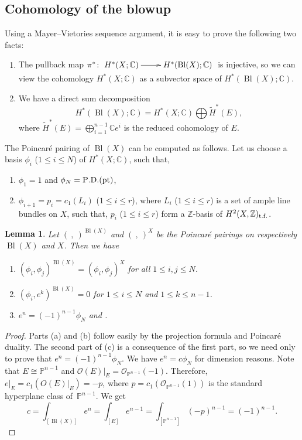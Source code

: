 \documentclass[pdftex]{sigma}
\numberwithin{equation}{section}
\newtheorem{Lemma}[Theorem]{Lemma}
\newcommand{\CC}{\mathbb{C}}
\newcommand{\ZZ}{\mathbb{Z}}
\newcommand{\PP}{\mathbb{P}}
\renewcommand{\O}{\mathcal{O}}
\begin{document}
\subsection{Cohomology of the blowup}
\label{sec:coh_blowup}
Using a Mayer--Vietories sequence
argument, it is easy to prove the following two facts:
\begin{enumerate}\itemsep=0pt
 \item[(1)]
The pullback map $\pi^*\colon\xymatrix{H^*(X;\CC)\ar[r] &
 H^*(\operatorname{Bl}(X);\CC)}$ is injective, so we can view the
 cohomology $H^*(X;\CC)$ as a subvector space of
 $H^*(\operatorname{Bl}(X);\CC)$.
\item[(2)]
 We have a direct sum decomposition
 \[
 H^*(\operatorname{Bl}(X);\CC) = H^*(X;\CC)\bigoplus
 \widetilde{H}^*(E),
 \]
 where $\widetilde{H}^*(E)= \bigoplus_{i=1}^{n-1} \CC e^i$ is the
 reduced cohomology of $E$.
\end{enumerate}
The Poincar\'e pairing of $\operatorname{Bl}(X)$ can be computed as follows.
Let us choose a basis $\phi_i$ ($1\leq i\leq N$) of
$H^*(X;\CC)$, such that,
\begin{enumerate}\itemsep=0pt
\item[(i)]
 $\phi_1=1$ and $\phi_N={\rm P.D.}({\rm pt})$,
\item[(ii)]
 $\phi_{i+1} =p_i=c_1(L_i)$ ($1\leq i\leq r$), where $L_i$ ($1\leq
 i\leq r$) is a set of ample line bundles on $X$, such that, $p_i$ ($1\leq
 i\leq r$) form a $\ZZ$-basis of $H^2(X,\ZZ)_{\rm t.f.}$.
\end{enumerate}
\begin{Lemma}\label{le:pp}
 Let $(\ ,\ )^{\operatorname{Bl}(X)}$ and $(\ ,\ )^X$ be the Poincar\'e
 pairings on respectively $ \operatorname{Bl}(X)$ and $X$. Then we have
\begin{enumerate}\itemsep=0pt
\item[$(a)$] $(\phi_i,\phi_j )^{\operatorname{Bl}(X)} = (\phi_i,\phi_j )^X$ for all
$1\leq i,j\leq N$.
\item[$(b)$] $(\phi_i,e^k )^{\operatorname{Bl}(X)} =0$ for $1\leq i\leq N$ and $1\leq
k\leq n-1$.
\item[$(c)$] $e^n=(-1)^{n-1} \phi_N$ and .
\end{enumerate}
\end{Lemma}
\begin{proof}
Parts (a) and (b) follow easily by the projection formula and Poincar\'e
duality. The second part of (c) is a consequence of the first part, so
we need only to prove that $e^n=(-1)^{n-1} \phi_N$. We have $e^n=c
\phi_N$ for dimension reasons. Note that
$E\cong \mathbb{P}^{n-1}$ and
$\O(E)|_E=\O_{\PP^{n-1}}(-1)$. Therefore, $e|_E=c_1(O(E)|_E) = -p$,
where $p=c_1(\O_{\PP^{n-1}}(1))$ is the standard hyperplane class of~$\PP^{n-1}$. We get
\[
c=\int_{[\operatorname{Bl}(X)]} e^n = \int_{[E]} e^{n-1} = \int_{[\PP^{n-1}]}
(-p)^{n-1} = (-1)^{n-1}.\tag*{\qed}
\]\renewcommand{\qed}{}
\end{proof}
\end{document}
